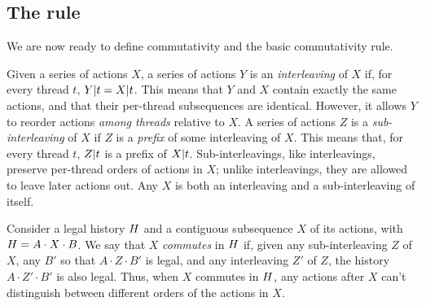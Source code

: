 \begin{comment}
\textbf{Nondeterminism.} We assume without loss of
generality${}^{\text{????}}$ that all operations have deterministic
return values. Of course, real operations often return nondeterministic
results. This can be modeled in various ways. For example, we might
model a nondeterministic action as returning a \emph{set} of values,
where the set contains all legal return values.
\XXX[AC][Do we need this, given that legality already accounts for
nondeterminism?]
\XXX[E][Yes, because commutativity doesn't say just that the scrambled
history is legal with SOME return values, we say that the scrambled
history is legal with THE SAME RETURN VALUES as in the original trace]
\XXX[AC][That's exactly my point.  Our definition \emph{already}
captures this, so why do we need to say something fuzzy about making
interface deterministic?  If we're going to say something about
nondeterminism, shouldn't we draw the reader's attention to how our
definitions capture it, rather than saying that they don't without
additional modeling?]
\XXX[E][I don't think it is your point but I don't think we actually need
to care about nondeterminism at this point in the doc]
\end{comment}

\subsection{The rule}
\label{rulerule}

We are now ready to define commutativity and the basic commutativity
rule.

Given a series of actions $X$,
a series of actions $Y$ is an
\emph{interleaving} of $X$ if, for every thread $t$,
$Y|t = X|t$.
%
This means that $Y$ and $X$ contain exactly the same actions, and that
their per-thread subsequences are identical. However, it allows $Y$ to
reorder actions \emph{among threads} relative to $X$.
%
A series of actions $Z$ is a \emph{sub-interleaving} of $X$ if $Z$ is a
\emph{prefix} of some interleaving of $X$.
%
This means that, for every thread $t$, $Z|t$ is a prefix of
$X|t$. Sub-interleavings, like interleavings, preserve per-thread
orders of actions in $X$; unlike interleavings, they are allowed to leave
later actions out.
%
Any $X$ is both an interleaving and a sub-interleaving of itself.

Consider a legal history $H$ and a contiguous subsequence $X$ of its
actions, with $H = A \cdot X \cdot B$.
%
We say that $X$ \emph{commutes} in $H$ if, given any
sub-interleaving $Z$ of $X$, any $B'$ so that
$A \cdot Z \cdot B'$ is legal, and any interleaving $Z'$ of $Z$, the
history $A \cdot Z' \cdot B'$ is also legal.
%
Thus, when $X$ commutes in $H$, any actions after $X$ can't
distinguish between different orders of the actions in $X$.

